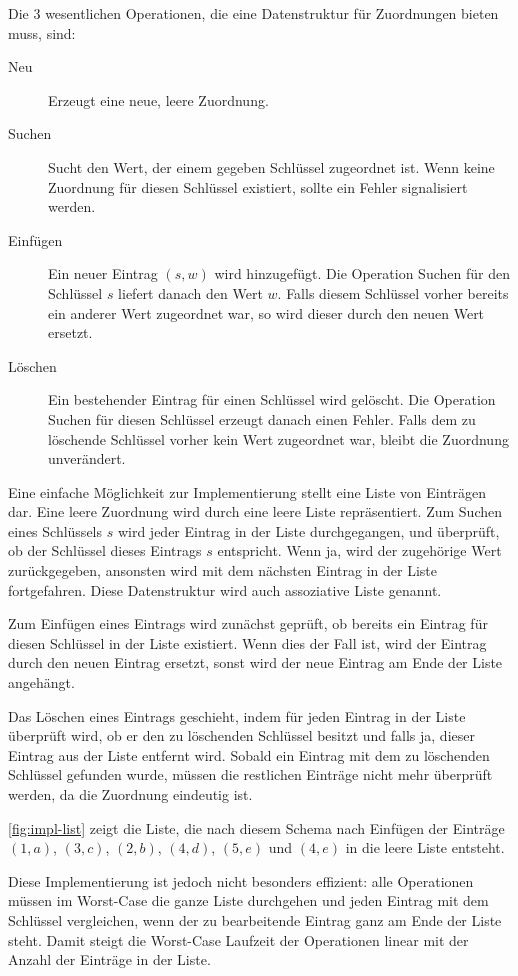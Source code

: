 \documentclass[a4paper, parskip]{scrartcl}
\begin{document}
Die 3 wesentlichen Operationen, die eine Datenstruktur für Zuordnungen bieten muss, sind:
\begin{description}
  \item[Neu]   
    Erzeugt eine neue, leere Zuordnung.
  \item[Suchen] 
    Sucht den Wert, der einem gegeben Schlüssel zugeordnet ist. 
    Wenn keine Zuordnung für diesen Schlüssel existiert, sollte ein Fehler signalisiert werden.
  \item[Einfügen]
    Ein neuer Eintrag $(s, w)$ wird hinzugefügt. 
    Die Operation Suchen für den Schlüssel $s$ liefert danach den Wert $w$. 
    Falls diesem Schlüssel vorher bereits ein anderer Wert zugeordnet war, so wird dieser durch den neuen Wert ersetzt.
  \item[Löschen] 
    Ein bestehender Eintrag für einen Schlüssel wird gelöscht. 
    Die Operation Suchen für diesen Schlüssel erzeugt danach einen Fehler. 
    Falls dem zu löschende Schlüssel vorher kein Wert zugeordnet war, bleibt die Zuordnung unverändert.
\end{description}

Eine einfache Möglichkeit zur Implementierung stellt eine Liste von Einträgen dar.
Eine leere Zuordnung wird durch eine leere Liste repräsentiert. 
Zum Suchen eines Schlüssels $s$ wird jeder Eintrag in der Liste durchgegangen, und überprüft, ob der Schlüssel dieses Eintrags $s$ entspricht. 
Wenn ja, wird der zugehörige Wert zurückgegeben, ansonsten wird mit dem nächsten Eintrag in der Liste fortgefahren.
Diese Datenstruktur wird auch assoziative Liste genannt.

Zum Einfügen eines Eintrags wird zunächst geprüft, ob bereits ein Eintrag für diesen Schlüssel in der Liste existiert. 
Wenn dies der Fall ist, wird der Eintrag durch den neuen Eintrag ersetzt, sonst wird der neue Eintrag am Ende der Liste angehängt. 

Das Löschen eines Eintrags geschieht, indem für jeden Eintrag in der Liste überprüft wird, ob er den zu löschenden Schlüssel besitzt und falls ja, dieser Eintrag aus der Liste entfernt wird. 
Sobald ein Eintrag mit dem zu löschenden Schlüssel gefunden wurde, müssen die restlichen Einträge nicht mehr überprüft werden, da die Zuordnung eindeutig ist.

\autoref{fig:impl-list} zeigt die Liste, die nach diesem Schema nach Einfügen der Einträge $(1,a)$, $(3,c)$, $(2,b)$, $(4,d)$, $(5,e)$ und $(4,e)$ in die leere Liste entsteht.

Diese Implementierung ist jedoch nicht besonders effizient: alle Operationen müssen im Worst-Case die ganze Liste durchgehen und jeden Eintrag mit dem Schlüssel vergleichen, wenn der zu bearbeitende Eintrag ganz am Ende der Liste steht.
Damit steigt die Worst-Case Laufzeit der Operationen linear mit der Anzahl der Einträge in der Liste.
\end{document}
